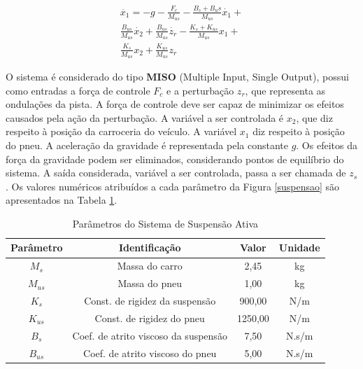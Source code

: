 \documentclass[journal,brazil,english]{IEEEtran}
\begin{document}
\begin{equation}\label{x1}
\begin{matrix}
\ddot{x_1}= -g - \frac{F_c}{M_{us}} - \frac{B_s+B_us}{M_{us}}\dot{x_1} + \\ \frac{B_{us}}{M_{us}}\dot{x_2} + \frac{B_{us}}{M_{us}}\dot{z_r} - \frac{K_s+K_{us}}{M_{us}}x_1 + \\ \frac{K_s}{M_{us}}x_2 + \frac{K_{us}}{M_{us}}z_r
\end{matrix}
\end{equation}

O sistema é considerado do tipo \textbf{MISO} (Multiple Input, Single Output), possui como entradas a força de controle $F_c$ e a perturbação $z_r$, que representa as ondulações da pista. A força de controle deve ser capaz de minimizar os efeitos causados pela ação da perturbação. A variável a ser controlada é $x_2$, que diz respeito à posição da carroceria do veículo. A variável $x_1$ diz respeito à posição do pneu. A aceleração da gravidade é representada pela constante $g$. Os efeitos da força da gravidade podem ser eliminados, considerando pontos de equilíbrio do sistema. A saída considerada, variável a ser controlada, passa a ser chamada de $z_s$. Os valores numéricos atribuídos a cada parâmetro da Figura \ref{suspensao} são apresentados na Tabela \ref{parametros}.

\begin{table}[H]{\centering}
\centering
	\caption{Parâmetros do Sistema de Suspensão Ativa}
	\begin{tabular}{|c|c|c|c|} \hline
   Parâmetro & Identificação & Valor & Unidade \\ \hline
	$M_s$ & Massa do carro & 2,45 & kg \\ \hline
  $M_{us}$ & Massa do pneu & 1,00 & kg \\ \hline
  $K_s$ & Const. de rigidez da suspensão & 900,00 & N/m \\ \hline
  $K_{us}$ & Const. de rigidez do pneu & 1250,00 & N/m \\ \hline
  $B_s$ & Coef. de atrito viscoso da suspensão & 7,50 & N.s/m \\ \hline
  $B_{us}$ & Coef. de atrito viscoso do pneu & 5,00 & N.s/m \\ \hline
   \end{tabular}
	\label{parametros}
\end{table}
\end{document}

